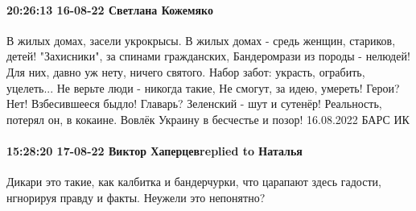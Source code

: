 
\paragraph{20:26:13 16-08-22 Светлана Кожемяко}

\obeycr
В жилых домах, засели укрокрысы.
В жилых домах - средь женщин, стариков, детей!
"Захисники", за спинами гражданских,
Бандеромрази из породы - нелюдей!
Для них, давно уж нету, ничего святого.
Набор забот: украсть, ограбить, уцелеть...
Не верьте люди - никогда такие,
Не смогут, за идею, умереть!
Герои? Нет! Взбесившееся быдло!
Главарь? Зеленский - шут и сутенёр!
Реальность, потерял он, в кокаине.
Вовлёк Украину в бесчестье и позор!
16.08.2022 БАРС ИК
\restorecr

\paragraph{15:28:20 17-08-22 Виктор Хаперцевreplied to Наталья}

Дикари это такие, как калбитка и бандерчурки, что царапают здесь гадости, нгнорируя правду и факты.
Неужели это непонятно?
